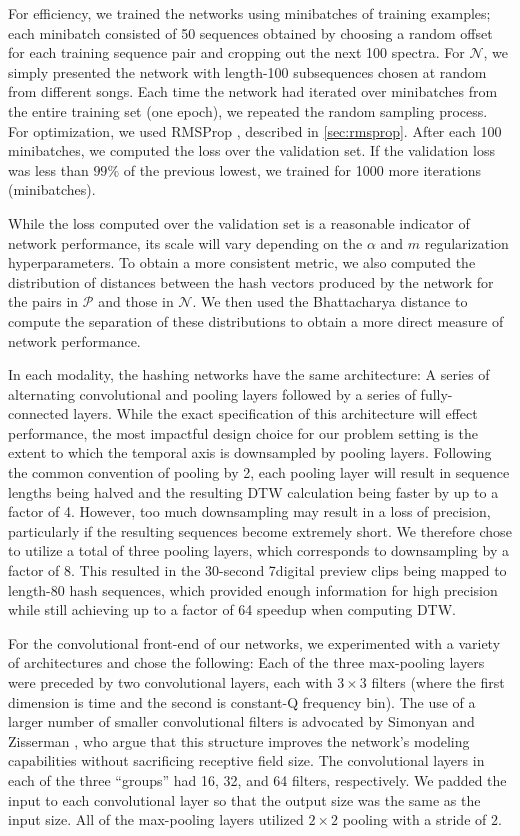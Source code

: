 For efficiency, we trained the networks using minibatches of training examples; each minibatch consisted of 50 sequences obtained by choosing a random offset for each training sequence pair and cropping out the next 100 spectra.
For $\mathcal{N}$, we simply presented the network with length-100 subsequences chosen at random from different songs.
Each time the network had iterated over minibatches from the entire training set (one epoch), we repeated the random sampling process.
For optimization, we used RMSProp \cite{tieleman2012lecture}, described in \cref{sec:rmsprop}.
After each 100 minibatches, we computed the loss over the validation set.
If the validation loss was less than $99\%$ of the previous lowest, we trained for 1000 more iterations (minibatches).

While the loss computed over the validation set is a reasonable indicator of network performance, its scale will vary depending on the $\alpha$ and $m$ regularization hyperparameters.
To obtain a more consistent metric, we also computed the distribution of distances between the hash vectors produced by the network for the pairs in $\mathcal{P}$ and those in $\mathcal{N}$.
We then used the Bhattacharya distance \cite{bhattacharyya1943measure} to compute the separation of these distributions to obtain a more direct measure of network performance.

In each modality, the hashing networks have the same architecture: A series of alternating convolutional and pooling layers followed by a series of fully-connected layers.
While the exact specification of this architecture will effect performance, the most impactful design choice for our problem setting is the extent to which the temporal axis is downsampled by pooling layers.
Following the common convention of pooling by 2, each pooling layer will result in sequence lengths being halved and the resulting DTW calculation being faster by up to a factor of 4.
However, too much downsampling may result in a loss of precision, particularly if the resulting sequences become extremely short.
We therefore chose to utilize a total of three pooling layers, which corresponds to downsampling by a factor of 8.
This resulted in the 30-second 7digital preview clips being mapped to length-80 hash sequences, which provided enough information for high precision while still achieving up to a factor of 64 speedup when computing DTW.

For the convolutional front-end of our networks, we experimented with a variety of architectures and chose the following:
Each of the three max-pooling layers were preceded by two convolutional layers, each with $3 \times 3$ filters (where the first dimension is time and the second is constant-Q frequency bin).
The use of a larger number of smaller convolutional filters is advocated by Simonyan and Zisserman \cite{simonyan2014very}, who argue that this structure improves the network's modeling capabilities without sacrificing receptive field size.
The convolutional layers in each of the three ``groups'' had 16, 32, and 64 filters, respectively.
We padded the input to each convolutional layer so that the output size was the same as the input size.
All of the max-pooling layers utilized $2 \times 2$ pooling with a stride of $2$.

